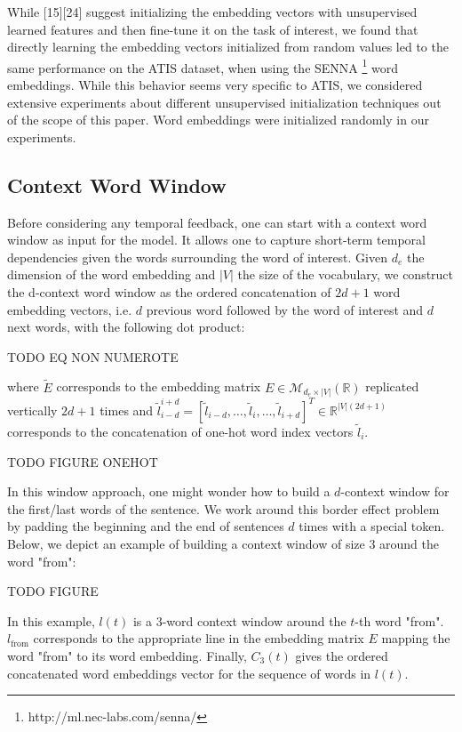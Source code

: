 While [15][24] suggest initializing the embedding vectors with unsupervised
learned features and then fine-tune it on the task of interest, we found that
directly learning the embedding vectors initialized from random values led to
the same performance on the ATIS dataset, when using the SENNA
\footnote{http://ml.nec-labs.com/senna/} word embeddings. While this behavior
seems very specific to ATIS, we considered extensive experiments about
different unsupervised initialization techniques out of the scope of this
paper. Word embeddings were initialized randomly in our experiments.

\subsection{Context Word Window}

Before considering any temporal feedback, one can start with a context word
window as input for the model. It allows one to capture short-term temporal
dependencies given the words surrounding the word of interest. Given $d_e$ the
dimension of the word embedding and $|V|$ the size of the vocabulary, we
construct the d-context word window as the ordered concatenation of $2d+1$ word
embedding vectors, i.e. $d$ previous word followed by the word of interest and $d$
next words, with the following dot product:

TODO EQ NON NUMEROTE %

where $\tilde{E}$ corresponds to the embedding matrix
$E\in\mathcal{M}_{d_e\times|V|}(\mathbb{R})$ replicated vertically $2d+1$ times
and $\tilde{l}_{i-d}^{i+d}= [
\tilde{l}_{i-d},\dots,\tilde{l}_i,\dots,\tilde{l}_{i+d}]^T\in\mathbb{R}^{|V|(2d+1)}$
corresponds to the concatenation of one-hot word index vectors $\tilde{l}_i$.

TODO FIGURE ONEHOT

In this window approach, one might wonder how to build a $d$-context window for
the first/last words of the sentence. We work around this border effect problem
by padding the beginning and the end of sentences $d$ times with a special token.
Below, we depict an example of building a context window of size $3$ around the
word "from":

TODO FIGURE

In this example, $l(t)$ is a $3$-word context window around the $t$-th word
"from".  $l_{\textrm{from}}$ corresponds to the appropriate line in the
embedding matrix $E$ mapping the word "from" to its word embedding. Finally,
$C_3 (t)$ gives the ordered concatenated word embeddings vector for the
sequence of words in $l(t)$.

